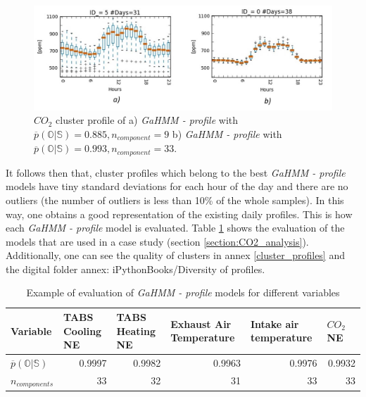 \begin{figure}[h!]
  \vspace{0.5em} %
  \includegraphics[scale=0.65]{Figures/box_plot.jpg}
  \caption{ $CO_2$ cluster profile of 
  a)  \textit{GaHMM - profile} with $\overline{p}(\mathbb{O}|\mathbb{S}) = 0.885, n_{component}=9 $ b) \textit{GaHMM - profile} with $\overline{p}(\mathbb{O}|\mathbb{S}) = 0.993, n_{component}=33$.}
  \label{fig:box_plot}
\end{figure} 


It follows then that, cluster profiles which belong to the best \textit{GaHMM - profile} models have tiny standard deviations for each hour of the day and there are no outliers (the number of outliers is less than 10\% of the whole samples). In this way, one obtains a good representation of the existing daily profiles. This is how each \textit{GaHMM - profile} model is evaluated. Table \ref{tab:profile_model_eval} shows the evaluation of the models that are used in a
case study (section \ref{section:CO2_analysis}). Additionally, one can see the quality of clusters in annex \ref{cluster_profiles} and the digital folder annex: iPythonBooks/Diversity of profiles.


\begin{table}[htbp]
  \centering
  \scriptsize
  \caption{Example of evaluation of \textit{GaHMM - profile} models for different variables}
    \begin{tabular}{|l|r|r|r|r|r|}
    \hline
    Variable & \multicolumn{1}{l|}{TABS Cooling NE} & \multicolumn{1}{l|}{TABS Heating NE} & \multicolumn{1}{l|}{Exhaust Air Temperature} & \multicolumn{1}{l|}{Intake air temperature} & \multicolumn{1}{l|}{$CO_2$ NE} \bigstrut\\
    \hline
    $\overline{p}(\mathbb{O}|\mathbb{S})$ & 0.9997 & 0.9982 & 0.9963 & 0.9976 & 0.9932 \bigstrut\\
    \hline
    $n_{components}$ & 33   & 32   & 31   & 33   & 33 \bigstrut\\
    \hline
    \end{tabular}%
  \label{tab:profile_model_eval}%
\end{table}%



